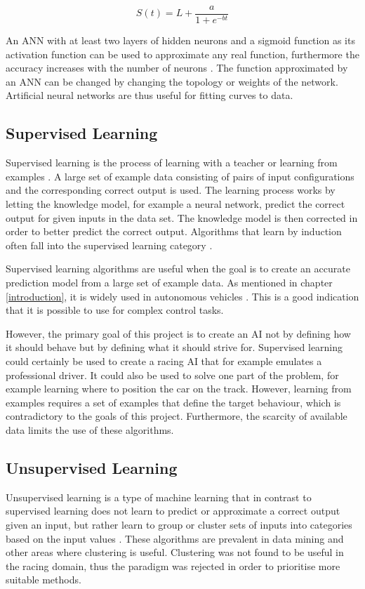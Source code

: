 \begin{equation}
    S(t) = L + \frac{a}{1 + e^{-bt}}
    \label{eq:sigmoid}
\end{equation}

\noindent
An ANN with at least two layers of hidden neurons and a sigmoid function as its activation function can be used to approximate any real function, furthermore the accuracy increases with the number of neurons \cite{mitchel:approximation}. The function approximated by an ANN can be changed by changing the topology or weights of the network. Artificial neural networks are thus useful for fitting curves to data. 

\subsection{Supervised Learning}
Supervised learning is the process of learning with a teacher or learning from examples \cite{haykin}. A large set of example data consisting of pairs of input configurations and the corresponding correct output is used. The learning process works by letting the knowledge model, for example a neural network, predict the correct output for given inputs in the data set. The knowledge model is then corrected in order to better predict the correct output. Algorithms that learn by induction often fall into the supervised learning category \cite{glossary}. 

Supervised learning algorithms are useful when the goal is to create an accurate prediction model from a large set of example data. As mentioned in chapter \ref{introduction}, it is widely used in autonomous vehicles \cite{Stavens, Thrun06, huval2015empirical}. This is a good indication that it is possible to use for complex control tasks.

However, the primary goal of this project is to create an AI not by defining how it should behave but by defining what it should strive for. Supervised learning could certainly be used to create a racing AI that for example emulates a professional driver. It could also be used to solve one part of the problem, for example learning where to position the car on the track. However, learning from examples requires a set of examples that define the target behaviour, which is contradictory to the goals of this project. Furthermore, the scarcity of available data limits the use of these algorithms.  

\subsection{Unsupervised Learning}
Unsupervised learning is a type of machine learning that in contrast to supervised learning does not learn to predict or approximate a correct output given an input, but rather learn to group or cluster sets of inputs into categories based on the input values \cite{glossary}. These algorithms are prevalent in data mining and other areas where clustering is useful. Clustering was not found to be useful in the racing domain, thus the paradigm was rejected in order to prioritise more suitable methods. 


